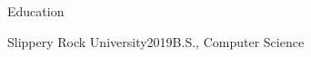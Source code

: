\documentclass{resume} %
\begin{document}
\begin{rSection}{Education}
\begin{rEducation}{Slippery Rock University}{2019}{B.S., Computer Science}{}
\end{rEducation}
\end{rSection}




\end{document}
